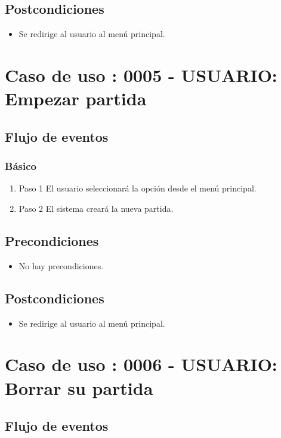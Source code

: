\subsection{Postcondiciones}
\begin{itemize}
\item Se redirige al usuario al menú principal.
\end{itemize}
\section{Caso de uso : 0005 - USUARIO: Empezar partida}\label{sec:uc0}



\subsection{Flujo de eventos}

\subsubsection{Básico}

\begin{enumerate}
\item Paso 1
El usuario seleccionará la opción desde el menú principal.
\item Paso 2
El sistema creará la nueva partida.
\end{enumerate}
\subsection{Precondiciones}
\begin{itemize}
\item No hay precondiciones.
\end{itemize}
\subsection{Postcondiciones}
\begin{itemize}
\item Se redirige al usuario al menú principal.
\end{itemize}
\section{Caso de uso : 0006 - USUARIO: Borrar su partida}\label{sec:uc0}



\subsection{Flujo de eventos}

